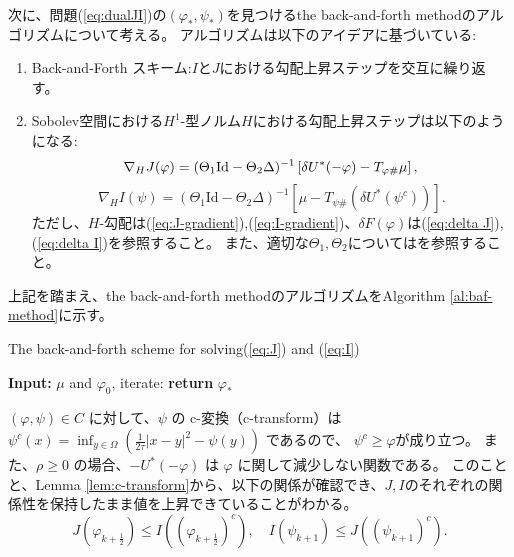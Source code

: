 次に、問題(\ref{eq:dualJI})の$(\varphi_*, \psi_*)$を見つけるthe back-and-forth methodのアルゴリズムについて考える。
アルゴリズムは以下のアイデアに基づいている$:$
\begin{enumerate}
    \item Back-and-Forth スキーム:$I$と$J$における勾配上昇ステップを交互に繰り返す。
    \item Sobolev空間における$H^1$-型ノルム$H$における勾配上昇ステップは以下のようになる:
        \begin{equation*}
            \nabla_H J(\varphi) = (\Theta_1 \text{Id} - \Theta_2 \Delta)^{-1} \left[\delta U^*(- \varphi)-  T_{\varphi \#} \mu \right], \\
        \end{equation*}
        \begin{equation*}
            \nabla_H I(\psi) = (\Theta_1 \text{Id} - \Theta_2 \Delta)^{-1} \left[\mu - T_{\psi \#} (\delta U^*(\psi^c))\right].
        \end{equation*}
    ただし、$H$-勾配は(\ref{eq:J-gradient}),(\ref{eq:I-gradient})、$\delta F(\varphi)$は(\ref{eq:delta J}),(\ref{eq:delta I})を参照すること。
    また、適切な$\Theta_1, \Theta_2$については\cite{MR4238775}を参照すること。
\end{enumerate}

上記を踏まえ、the back-and-forth methodのアルゴリズムをAlgorithm \ref{al:baf-method}に示す。

\begin{algorithm}[tb]
    \caption{The back-and-forth scheme for solving(\ref{eq:J}) and (\ref{eq:I})}
    \label{al:baf-method}
    \begin{algorithmic}
    \State \textbf{Input:} $\mu$ and $\varphi_0$, iterate:
    \State \textbf{return} $\varphi_*$
    \end{algorithmic}
\end{algorithm}

\((\varphi, \psi) \in C\) に対して、\(\psi\) の c-変換（c-transform）は
$
    \psi^c(x) = \inf_{y \in \Omega} \left( \frac{1}{2\tau}|x-y|^2 - \psi(y)\right)
$
であるので、
\(\psi^c \geq \varphi\)が成り立つ。
また、\(\rho \geq 0\) の場合、\(- U^*(-\varphi)\) は \(\varphi\) に関して減少しない関数である。
このことと、Lemma \ref{lem:c-transform}から、以下の関係が確認でき、$J, I$のそれぞれの関係性を保持したまま値を上昇できていることがわかる。
\[
    J(\varphi_{k + \frac{1}{2}}) \leq I((\varphi_{k + \frac{1}{2}})^c), \quad I(\psi_{k+1}) \leq J((\psi_{k+1})^c). 
\]


